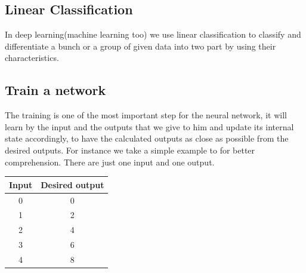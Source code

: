 \subsection{Linear Classification}
\par In deep learning(machine learning too) we use linear classification to classify and differentiate a bunch or a group of given data into two part by using their characteristics. \newline


\subsection{Train a network}
The training is one of the most important step for the neural network, it will learn by the input and the outputs that we give to him and update its internal state accordingly, to have the calculated outputs as close as possible from the desired outputs. \newline 
For instance we take a simple example to for better comprehension. There are just one input and one output.
\begin{table}[h!]
\centering
 \begin{tabular}{|c|c|} 
 \hline
 Input & Desired output \\ [0.7ex] 
 \hline\hline
 0 & 0 \\ 
 1 & 2 \\
 2 & 4 \\
 3 & 6 \\
 4 & 8 \\ [1ex] 
 \hline
 \end{tabular}
\end{table}

